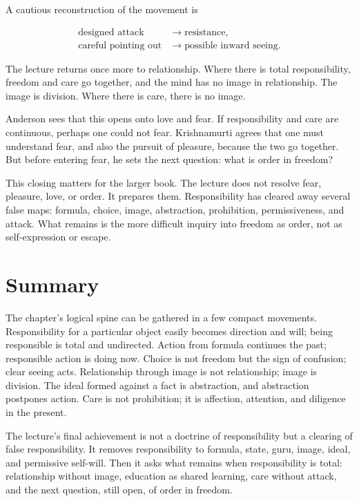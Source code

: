 A cautious reconstruction of the movement is

\begin{align}
\text{designed attack}
&\longrightarrow \text{resistance}, \\
\text{careful pointing out}
&\longrightarrow \text{possible inward seeing}.
\end{align}

The lecture returns once more to relationship. Where there is total responsibility, freedom and care go together, and the mind has no image in relationship. The image is division. Where there is care, there is no image.

Anderson sees that this opens onto love and fear. If responsibility and care are continuous, perhaps one could not fear. Krishnamurti agrees that one must understand fear, and also the pursuit of pleasure, because the two go together. But before entering fear, he sets the next question: what is order in freedom?

This closing matters for the larger book. The lecture does not resolve fear, pleasure, love, or order. It prepares them. Responsibility has cleared away several false maps: formula, choice, image, abstraction, prohibition, permissiveness, and attack. What remains is the more difficult inquiry into freedom as order, not as self-expression or escape.

\section{Summary}

The chapter's logical spine can be gathered in a few compact movements. Responsibility for a particular object easily becomes direction and will; being responsible is total and undirected. Action from formula continues the past; responsible action is doing now. Choice is not freedom but the sign of confusion; clear seeing acts. Relationship through image is not relationship; image is division. The ideal formed against a fact is abstraction, and abstraction postpones action. Care is not prohibition; it is affection, attention, and diligence in the present.

The lecture's final achievement is not a doctrine of responsibility but a clearing of false responsibility. It removes responsibility to formula, state, guru, image, ideal, and permissive self-will. Then it asks what remains when responsibility is total: relationship without image, education as shared learning, care without attack, and the next question, still open, of order in freedom.